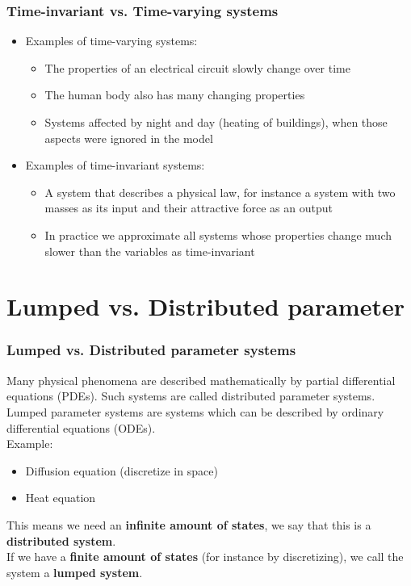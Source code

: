 \documentclass{beamer}
\begin{document}

\begin{frame}
\frametitle{Time-invariant vs. Time-varying systems}
\begin{itemize}
\item Examples of time-varying systems:
\smallskip
\begin{itemize}
\item \normalsize{The properties of an electrical circuit slowly change over time}
\smallskip
\item \normalsize{The human body also has many changing properties}
\smallskip
\item \normalsize{Systems affected by night and day (heating of buildings), when those aspects were ignored in the model}
\end{itemize}
\medskip
\item Examples of time-invariant systems:
\smallskip
\begin{itemize}
\item \normalsize{A system that describes a physical law, for instance a system with two masses as its input and their attractive force as an output}
\smallskip
\item \normalsize{In practice we approximate all systems whose properties change much slower than the variables as time-invariant}
\end{itemize}
\end{itemize}
\end{frame}

\section{Lumped vs. Distributed parameter} 

\begin{frame}
\frametitle{Lumped vs. Distributed parameter systems}
Many physical phenomena are described mathematically by partial differential equations (PDEs). Such systems are called distributed parameter systems.\\
Lumped parameter systems are systems which can be described by ordinary differential equations (ODEs).\\
Example:\\
\begin{itemize}
\item Diffusion equation (discretize in space)
\item Heat equation
\end{itemize}
This means we need an \textbf{infinite amount of states}, we say that this is a \textbf{distributed system}.\\
If we have a \textbf{finite amount of states} (for instance by discretizing), we call the system a \textbf{lumped system}.\\
\end{frame}

\end{document}
